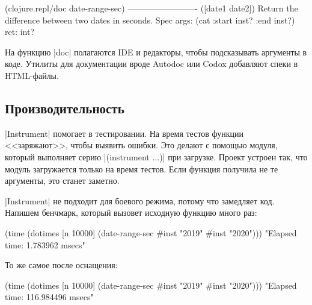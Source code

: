 \begin{english}
  \begin{clojure}
(clojure.repl/doc date-range-sec)
-------------------------
([date1 date2])
  Return the difference between two dates in seconds.
Spec
  args: (cat :start inst? :end inst?)
  ret: int?
  \end{clojure}
\end{english}


На функцию \spverb|doc| полагаются IDE и редакторы, чтобы подсказывать аргументы
в коде. Утилиты для документации вроде
Autodoc или
Codox добавляют спеки в
HTML-файлы.

\subsection{Производительность}


\spverb|Instrument| помогает в тестировании. На время тестов функции
<<заряжают>>, чтобы выявить ошибки. Это делают с помощью модуля, который
выполняет серию \spverb|(instrument ...)| при загрузке. Проект устроен так, что
модуль загружается только на время тестов. Если функция получила не те
аргументы, это станет заметно.


\spverb|Instrument| не подходит для боевого режима, потому что замедляет
код. Напишем бенчмарк, который вызовет исходную функцию много раз:


\begin{english}
  \begin{clojure}
(time
 (dotimes [n 10000]
   (date-range-sec #inst "2019" #inst "2020")))
"Elapsed time: 1.783962 msecs"
  \end{clojure}
\end{english}

\noindent
То же самое после оснащения:

\begin{english}
  \begin{clojure}
(time
 (dotimes [n 10000]
   (date-range-sec #inst "2019" #inst "2020")))
"Elapsed time: 116.984496 msecs"
  \end{clojure}
\end{english}

